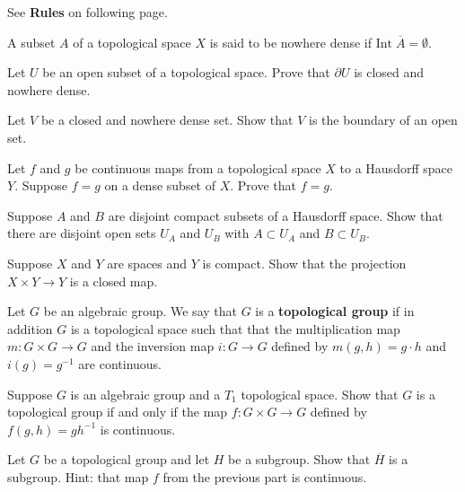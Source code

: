 \documentclass{homework651}
\def\ra{\rightarrow}
\def\Reals{\mathbb{R}}
\begin{document}
See \textbf{Rules} on following page.


\begin{problems}
\problem A subset $A$ of a topological space $X$ is said to be nowhere dense if $\mathrm{Int}\; \overline{A} = \emptyset$.
\begin{subproblems}
\item Let $U$ be an open subset of a topological space. Prove that $\partial U$ is closed and nowhere dense.
\item Let $V$ be a closed and nowhere dense set. Show that $V$ is the boundary of an open set.
\end{subproblems}


\problem Let $f$ and $g$ be continuous maps from a topological space $X$ to a Hausdorff
space $Y$.  Suppose $f=g$ on a dense subset of $X$. Prove that $f=g$. 

\problem Suppose $A$ and $B$ are disjoint compact subsets
of a Hausdorff space.  Show that there are disjoint open sets $U_A$
and $U_B$ with $A\subset U_A$ and $B \subset U_B$.

\problem Suppose $X$ and $Y$ are spaces and $Y$ is compact.
Show that the projection $X\times Y \to Y$ is a closed map.

\problem Let $G$ be an algebraic group.  We say that $G$ is a {\bf topological group}
if in addition $G$ is a topological space
such that that the multiplication
map $m:G\times G\ra G$ and the inversion map $i:G\ra G$ defined by $m(g,h)=g\cdot h$ and $i(g)=g^{-1}$
are continuous.
\begin{subproblems}
\item
Suppose $G$ is an algebraic group and a $T_1$ topological space.  Show that $G$ is a 
topological group if and only if the map $f:G\times G\ra G$ defined by $f(g,h)=g h^{-1}$
is continuous.
\item Let $G$ be a topological group and let $H$ be a subgroup.  Show that $\overline H$ is
a subgroup.  Hint: that map $f$ from the previous part is continuous. 
\end{subproblems}



\end{problems}
\end{document}
